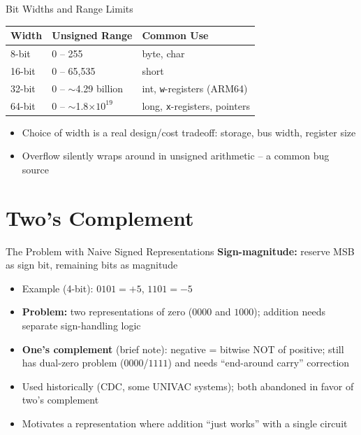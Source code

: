\documentclass[10pt, aspectratio=169]{beamer}
\begin{document}
\begin{frame}{Bit Widths and Range Limits}
\begin{center}
\begin{tabular}{l l l}
\textbf{Width} & \textbf{Unsigned Range} & \textbf{Common Use} \\
\hline
8-bit  & 0 -- 255 & byte, char \\
16-bit & 0 -- 65{,}535 & short \\
32-bit & 0 -- $\sim$4.29 billion & int, \texttt{w}-registers (ARM64) \\
64-bit & 0 -- $\sim$1.8$\times10^{19}$ & long, \texttt{x}-registers, pointers \\
\end{tabular}
\end{center}
\begin{itemize}
    \item Choice of width is a real design/cost tradeoff: storage, bus width, register size
    \item Overflow silently wraps around in unsigned arithmetic -- a common bug source
\end{itemize}
\end{frame}

\section{Two's Complement}

\begin{frame}{The Problem with Naive Signed Representations}
\textbf{Sign-magnitude:} reserve MSB as sign bit, remaining bits as magnitude
\begin{itemize}
    \item Example (4-bit): $0101 = +5$, $1101 = -5$
    \item \textbf{Problem:} two representations of zero ($0000$ and $1000$); addition needs separate sign-handling logic
    \item \textbf{One's complement} (brief note): negative = bitwise NOT of positive; still has dual-zero problem ($0000$/$1111$) and needs ``end-around carry'' correction
    \item Used historically (CDC, some UNIVAC systems); both abandoned in favor of two's complement
    \item Motivates a representation where addition ``just works'' with a single circuit
\end{itemize}
\end{frame}
\end{document}
